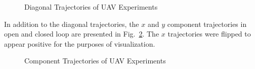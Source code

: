 \documentclass[letterpaper, 10 pt, conference]{ieeeconf}  %
\begin{document}
\begin{figure}[h]
	\centering
	\caption{Diagonal Trajectories of UAV Experiments}
	\label{fig:1723}
\end{figure}

In addition to the diagonal trajectories, the $x$ and $y$ component trajectories in open and closed loop are presented in Fig.~\ref{fig:expcomponents}. The $x$ trajectories were flipped to appear positive for the purposes of visualization.

\begin{figure}[h]
	\centering
	\caption{Component Trajectories of UAV Experiments}
	\label{fig:expcomponents}
\end{figure}
\end{document}
